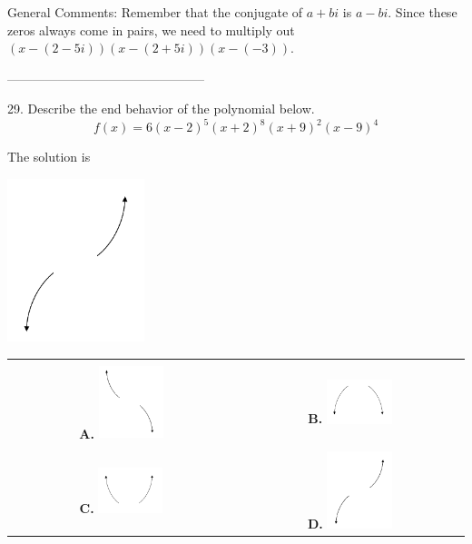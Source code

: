 \documentclass{article}[14pt]
\begin{document}
General Comments: Remember that the conjugate of $a+bi$ is $a-bi$. Since these zeros always come in pairs, we need to multiply out $(x-(2 - 5i))(x-(2 + 5i))(x-(-3))$.

-----------------------------------------------

29. Describe the end behavior of the polynomial below.
$$ f(x) = 6(x - 2)^{5}(x + 2)^{8}(x + 9)^{2}(x - 9)^{4} $$ 

 
 The solution is  
 \begin{center} \includegraphics[width=0.3\textwidth]{../Figures/endBehaviorPositiveOddC.png} \end{center}\begin{tabular}{|c|c|} 
\hline 
 & \tabularnewline 
 \textbf{A.} \includegraphics[width=0.3\textwidth]{../Figures/endBehaviorNegativeOddC.png} & \textbf{B.} \includegraphics[width=0.3\textwidth]{../Figures/endBehaviorNegativeEvenC.png} \tabularnewline 
\hline 
 & \tabularnewline 
 \textbf{C.} \includegraphics[width=0.3\textwidth]{../Figures/endBehaviorPositiveEvenC.png} & \textbf{D.} \includegraphics[width=0.3\textwidth]{../Figures/endBehaviorPositiveOddC.png} \tabularnewline 

\end{tabular}
\end{document}
